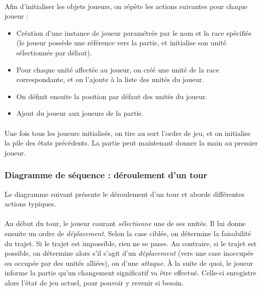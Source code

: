 \documentclass[a4paper]{article}
\begin{document}
\paragraph{}
Afin d'initialiser les objets joueurs, on répète les actions suivantes pour chaque joueur : 
\begin{itemize}
    \item Création d'une instance de joueur paramétrée par le nom et la race spécifiés (le joueur possède une référence vers la partie, et initialise son unité sélectionnée par défaut).
    \item Pour chaque unité affectée au joueur, on créé une unité de la race correspondante, et on l'ajoute à la liste des unités du joueur.
    \item On définit ensuite la position par défaut des unités du joueur.
    \item Ajout du joueur aux joueurs de la partie.
\end{itemize}

\paragraph{}
Une fois tous les joueurs initialisés, on tire au sort l'ordre de jeu, et on initialise la pile des états précédents.
La partie peut maintenant donner la main au premier joueur.



\subsubsection{Diagramme de séquence : déroulement d'un tour}

Le diagramme suivant présente le déroulement d'un tour et aborde différentes actions typiques.

\paragraph{}
Au début du tour, le joueur courant \textit{sélectionne} une de ses unités. Il lui donne ensuite un ordre de \textit{déplacement}. Selon la case ciblée, on détermine la faisabilité du trajet. Si le trajet est impossible, rien ne se passe. Au contraire, si le trajet est possible, on détermine alors s'il s'agit d'un \textit{déplacement} (vers une case inoccupée ou occupée par des unités alliées), ou d'une \textit{attaque}. À la suite de quoi, le joueur informe la partie qu'un changement significatif va être effectué. Celle-ci enregistre alors l'état de jeu actuel, pour pouvoir y revenir si besoin.
\end{document}
